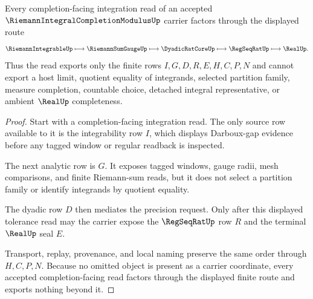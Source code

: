 \begin{theorem}
\label{thm:riemann-integral-completion-modulus-handoff}
Every completion-facing integration read of an accepted $\RiemannIntegralCompletionModulusUp$ carrier factors through the displayed route
$$
\RiemannIntegrableUp \longmapsto \RiemannSumGaugeUp \longmapsto \DyadicRatCoreUp \longmapsto \RegSeqRatUp \longmapsto \RealUp .
$$
Thus the read exports only the finite rows $I,G,D,R,E,H,C,P,N$ and cannot export a host limit, quotient equality of integrands, selected partition family, measure completion, countable choice, detached integral representative, or ambient $\RealUp$ completeness.
\end{theorem}
\begin{proof}
Start with a completion-facing integration read. The only source row available to it is the integrability row $I$, which displays Darboux-gap evidence before any tagged window or regular readback is inspected.

The next analytic row is $G$. It exposes tagged windows, gauge radii, mesh comparisons, and finite Riemann-sum reads, but it does not select a partition family or identify integrands by quotient equality.

The dyadic row $D$ then mediates the precision request. Only after this displayed tolerance read may the carrier expose the $\RegSeqRatUp$ row $R$ and the terminal $\RealUp$ seal $E$.

Transport, replay, provenance, and local naming preserve the same order through $H,C,P,N$. Because no omitted object is present as a carrier coordinate, every accepted completion-facing read factors through the displayed finite route and exports nothing beyond it.
\end{proof}


